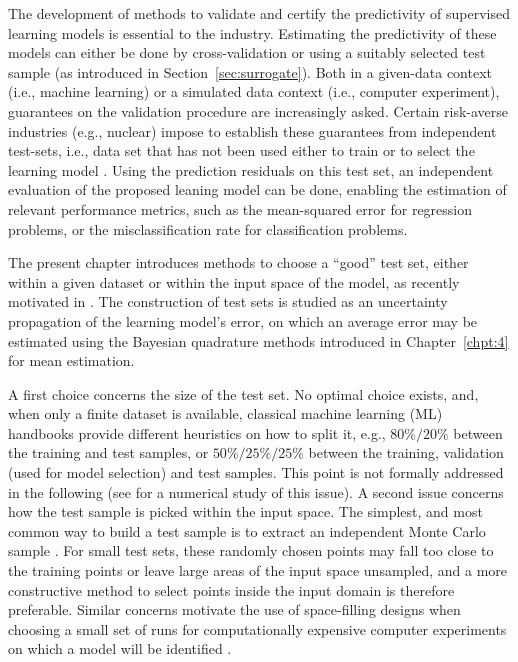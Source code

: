 
The development of methods to validate and certify the predictivity of supervised learning models is essential to the industry. 
Estimating the predictivity of these models can either be done by cross-validation or using a suitably selected test sample (as introduced in Section~\ref{sec:surrogate}). 
Both in a given-data context (i.e., machine learning) or a simulated data context (i.e., computer experiment), guarantees on the validation procedure are increasingly asked. 
Certain risk-averse industries (e.g., nuclear) impose to establish these guarantees from independent test-sets, i.e., data set that has not been used either to train or to select the learning model \citep{borjir12,xugoo18,ioo21}. 
Using the prediction residuals on this test set, an independent evaluation of the proposed leaning model can be done, enabling the estimation of relevant performance metrics, such as the mean-squared error for regression problems, or the misclassification rate for classification problems.

The present chapter introduces methods to choose a ``good'' test set, either within a given dataset or within the input space of the model, as recently motivated in \citet{ioo21,josvak21}. 
The construction of test sets is studied as an uncertainty propagation of the learning model's error, on which an average error may be estimated using the Bayesian quadrature methods introduced in Chapter~\ref{chpt:4} for mean estimation. 

A first choice concerns the size of the test set. No optimal choice exists, and, when only a finite dataset is available, classical machine learning (ML) handbooks \citep{tibshirani_2009,gooben16} provide different heuristics on how to split it, e.g., $80\% / 20\%$ between the training and test samples, or $50\% / 25\% / 25\%$ between the training, validation (used for model selection) and test samples. 
This point is not formally addressed in the following (see \citealp{xugoo18} for a numerical study of this issue).   
A second issue concerns how the test sample is picked within the input space. The simplest, and most common way to build a test sample is to extract an independent Monte Carlo sample \citep{tibshirani_2009}. 
For small test sets, these randomly chosen points may fall too close to the training points or leave large areas of the input space unsampled, and a more constructive method to select points inside the input domain is therefore preferable. 
Similar concerns motivate the use of space-filling designs when choosing a small set of runs for computationally expensive computer experiments on which a model will be identified \citep{fanli06,pronzato_2012}. 

